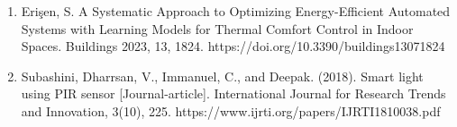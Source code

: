 \documentclass[a4paper]{scrartcl}
\begin{document}
\begin{enumerate}
    \item Erişen, S. A Systematic Approach to Optimizing Energy-Efficient Automated Systems with Learning Models for Thermal Comfort Control in Indoor Spaces. Buildings 2023, 13, 1824. https://doi.org/10.3390/buildings13071824
    
    \item Subashini, Dharrsan, V., Immanuel, C., and Deepak. (2018). Smart light using PIR sensor [Journal-article]. International Journal for Research Trends and Innovation, 3(10), 225. https://www.ijrti.org/papers/IJRTI1810038.pdf
    
\end{enumerate}
\end{document}
